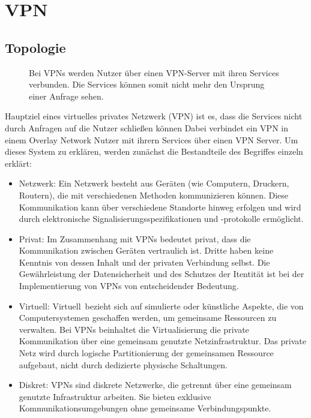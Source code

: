 \section{VPN}
\label{chap:vpn}

\subsection{Topologie}
\label{chap:vpn_topology}

\begin{figure}[h!]
    \centering
    
    \caption{Bei VPNs werden Nutzer über einen VPN-Server mit ihren Services verbunden. Die Services können somit nicht mehr den Ursprung einer Anfrage sehen.}
    \label{imgs:vpn}
\end{figure}

Hauptziel eines virtuelles privates Netzwerk (VPN) ist es, dass die Services nicht durch Anfragen auf die Nutzer schließen können Dabei verbindet ein VPN in einem Overlay Network Nutzer mit ihrern Services über einen VPN Server. Um dieses System zu erklären, werden zunächst die Bestandteile des Begriffes einzeln erklärt:

\begin{itemize}
    \item Netzwerk: Ein Netzwerk besteht aus Geräten (wie Computern, Druckern, Routern), die mit verschiedenen Methoden kommunizieren können. Diese Kommunikation kann über verschiedene Standorte hinweg erfolgen und wird durch elektronische Signalisierungsspezifikationen und -protokolle ermöglicht.
    \item Privat: Im Zusammenhang mit VPNs bedeutet \glqq privat\grqq, dass die Kommunikation zwischen Geräten vertraulich ist. Dritte haben keine Kenntnis von dessen Inhalt und der privaten Verbindung selbst. Die Gewährleistung der Datensicherheit und des Schutzes der Itentität ist bei der Implementierung von VPNs von entscheidender Bedeutung.
    \item Virtuell: \glqq Virtuell\grqq\ bezieht sich auf simulierte oder künstliche Aspekte, die von Computersystemen geschaffen werden, um gemeinsame Ressourcen zu verwalten. Bei VPNs beinhaltet die Virtualisierung die private Kommunikation über eine gemeinsam genutzte Netzinfrastruktur. Das private Netz wird durch logische Partitionierung der gemeinsamen Ressource aufgebaut, nicht durch dedizierte physische Schaltungen.
    \item Diskret: VPNs sind diskrete Netzwerke, die getrennt über eine gemeinsam genutzte Infrastruktur arbeiten. Sie bieten exklusive Kommunikationsumgebungen ohne gemeinsame Verbindungspunkte.
\end{itemize}

